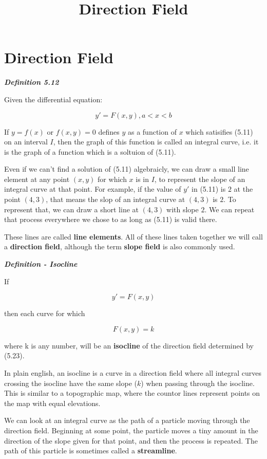 \documentclass{article}
\title{Direction Field}
\begin{document}
\section{Direction Field}

\emph{\textbf{Definition 5.12}} 

Given the differential equation:

\[ y' = F(x,y), a < x < b \tag{5.11} \]

If $y=f(x)$ or $f(x,y) =0$ defines $y$ as a function of $x$ which satisifies (5.11) on an \@{interval} $I$, then the graph of this function is called an integral curve, i.e. it is the graph of a function which is a soltuion of (5.11).

Even if we can't find a solution of (5.11) algebraicly, we can draw a small line element at any point $(x,y)$ for which $x$ is in $I$, to represent the slope of an integral curve at that point. For example, if the value of $y'$ in (5.11) is $2$ at the point $(4,3)$, that means the slop of an integral curve at $(4,3)$ is $2$. To represent that, we can draw a short line at $(4,3)$ with slope $2$. We can repeat that process everywhere we chose to as long as (5.11) is valid there.

These lines are called \textbf{line elements}. All of these lines taken together we will call a \textbf{direction field}, although the term \textbf{slope field} is also commonly used.

\emph{\textbf{Definition - Isocline}}

If

\[ y' = F(x,y) \tag{5.23} \]

then each curve for which 

\[ F(x,y) = k \tag{5.24} \]

where k is any number, will be an \textbf{isocline} of the direction field determined by (5.23). 

In plain english, an isocline is a curve in a direction field where all integral curves crossing the isocline have the same slope ($k$) when passing through the isocline. This is similar to a topographic map, where the countor lines represent points on the map with equal elevations.

We can look at an integral curve as the path of a particle moving through the direction field. Beginning at some point, the particle moves a tiny amount in the direction of the slope given for that point, and then the process is repeated. The path of this particle is sometimes called a \textbf{streamline}.
\end{document}
